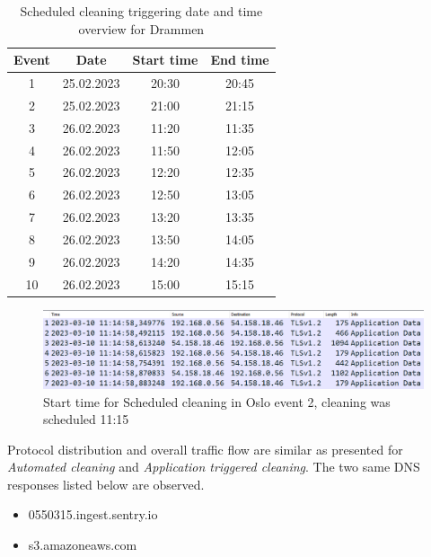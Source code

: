 \begin{table}[H]
\centering
\caption{Scheduled cleaning triggering date and time overview for Drammen}
\label{tab:SC_dateandtimeDrammen}
\begin{tabular}{|c|c|c|c|}
\hline
\textbf{Event} & \textbf{Date} & \textbf{Start time} & \textbf{End time} \\ \hline
1              & 25.02.2023         & 20:30               & 20:45             \\ \hline
2              & 25.02.2023         & 21:00               & 21:15             \\ \hline
3              & 26.02.2023         & 11:20               & 11:35             \\ \hline
4              & 26.02.2023         & 11:50               & 12:05             \\ \hline
5              & 26.02.2023         & 12:20               & 12:35             \\ \hline
6              & 26.02.2023         & 12:50               & 13:05             \\ \hline
7              & 26.02.2023         & 13:20               & 13:35             \\ \hline
8              & 26.02.2023         & 13:50               & 14:05             \\ \hline
9              & 26.02.2023         & 14:20               & 14:35             \\ \hline
10             & 26.02.2023         & 15:00               & 15:15             \\ \hline
\end{tabular}
\end{table}

\begin{figure}[H]
    \centering
    \includegraphics[width=\textwidth]{figures/SC_start_time.png}
    \caption{Start time for Scheduled cleaning in Oslo event 2, cleaning was scheduled 11:15}
    \label{fig:SC_start_time}
\end{figure}


Protocol distribution and overall traffic flow are similar as presented for \textit{Automated cleaning} and \textit{Application triggered cleaning}. The two same \gls{DNS} responses listed below are observed. 
\begin{itemize}
    \item 0550315.ingest.sentry.io
    \item s3.amazoneaws.com
\end{itemize}



